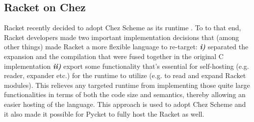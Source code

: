 \subsection{Racket on Chez}
\label{subsec:racketcs}

Racket recently decided to adopt Chez Scheme as its runtime
\cite{racket-on-chez-19}. To to that end, Racket developers made two
important implementation decisions that (among other things) made
Racket a more flexible language to re-target: \textit{\textbf{i)}}
separated the expansion and the compilation that were fused together
in the original C implementation \textit{\textbf{ii)}} export some
functionality that's essential for self-hosting (e.g. reader, expander
etc.) for the runtime to utilize (e.g. to read and expand Racket
modules). This relieves any targeted runtime from implementing those
quite large functionalities in terms of both the code size and
semantics, thereby allowing an easier hosting of the language. This
approach is used to adopt Chez Scheme and it also made it possible for
Pycket to fully host the Racket as well.
